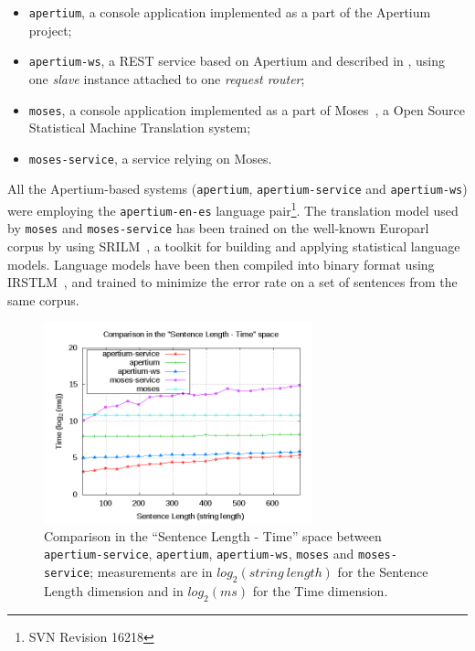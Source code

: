 \documentclass[11pt]{article}
\begin{document}

\begin{itemize}
 \item {\tt\small apertium}, a console application implemented as a part of the Apertium project;
 \item {\tt\small apertium-ws}, a REST service based on Apertium and described in \cite{sanchez-cartagena2009scalable}, using one \emph{slave} instance attached to one \emph{request router};
 \item {\tt\small moses}, a console application implemented as a part of Moses~\citep{moses}, a Open Source Statistical Machine Translation system;
 \item {\tt\small moses-service}, a service relying on Moses.
\end{itemize}

All the Apertium-based systems ({\tt\small apertium}, {\tt\small apertium-service} and {\tt\small apertium-ws}) were employing the {\tt\small apertium-en-es} language pair\footnote{SVN Revision 16218}. The translation model used by {\tt\small moses} and {\tt\small moses-service} has been trained on the well-known Europarl~\citep{europarl} corpus by using SRILM~\citep{srilm}, a toolkit for building and applying statistical language models. Language models have been then compiled into binary format using IRSTLM~\citep{irstlm}, and trained to minimize the error rate on a set of sentences from the same corpus. 

\begin{figure}[!ht]
\begin{center}
\includegraphics[width=7.75cm]{comp}
\end{center}
\caption{Comparison in the ``Sentence Length - Time'' space between {\tt\small apertium-service}, {\tt\small apertium}, {\tt\small apertium-ws}, {\tt\small moses} and {\tt\small moses-service}; measurements are in $log_{2}(string\ length)$ for the Sentence Length dimension and in $log_{2}(ms)$ for the Time dimension.}
\label{fig:comp}
\end{figure}
\end{document}
